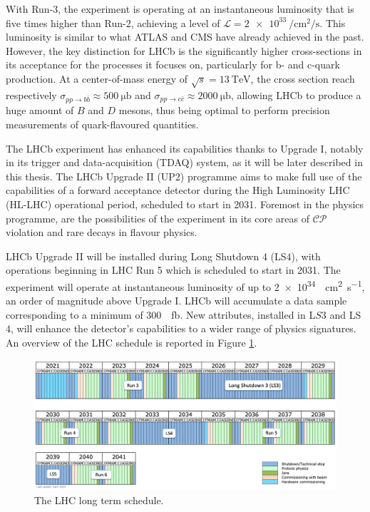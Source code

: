 With Run-3, the experiment is operating at an instantaneous luminosity that is five times higher than Run-2, achieving a level of $\mathcal{L}=\SI{2e33}{\per\centi\meter\squared\per\second}$. This luminosity is similar to what ATLAS and CMS have already achieved in the past. However, the key distinction for LHCb is the significantly higher cross-sections in its acceptance for the processes it focuses on, particularly for b- and c-quark production. At a center-of-mass energy of $\sqrt{s}=\SI{13}{\tera\eV}$, the cross section reach respectively $\sigma_{pp\rightarrow b\bar{b}}\approx\SI{500}{\micro\barn}$ and $\sigma_{pp\rightarrow c\bar{c}}\approx\SI{2000}{\micro\barn}$\cite{bCrossSection, Aaij:2057627}, allowing LHCb to produce a huge amount of $B$ and $D$ mesons, thus being optimal to perform precision measurements of quark-flavoured quantities.

The LHCb experiment has enhanced its capabilities thanks to Upgrade I\cite{lhcbcollaboration2023lhcb}, notably in its trigger and data-acquisition (TDAQ) system, as it will be later described in this thesis. 
The LHCb Upgrade II (UP2) programme\cite{CERN-LHCC-2021-012} aims to make full use of the capabilities of a forward acceptance detector during the High Luminosity LHC (HL-LHC) operational period, scheduled to start in 2031. Foremost in the physics programme, are the possibilities of the experiment in its core areas of $\mathcal{CP}$ violation and rare decays in flavour physics.

LHCb Upgrade II will be installed during Long Shutdown 4 (LS$4$), with operations beginning in LHC Run 5 which is scheduled to start in 2031. The experiment will operate at instantaneous luminosity of up to \SI{2e34}{\per\centi\meter\squared\per\second}, an order of magnitude above Upgrade I. LHCb will accumulate a data sample corresponding to a minimum of \SI{300}{\per\femto\barn}\cite{Efthymiopoulos:2319258}. New attributes, installed in L$S3$ and LS$4$, will enhance the detector’s capabilities to a wider range of physics signatures. An overview of the LHC schedule is reported in Figure \ref{fig:LHC_schedule}.

\begin{figure}
    \centering
    \includegraphics[width=\textwidth]{figures/LHC-long-term-Apr23.png}
    \caption{The LHC long term schedule.}
    \label{fig:LHC_schedule}
\end{figure}

